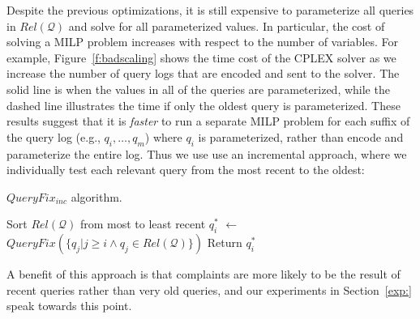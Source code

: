 
Despite the previous optimizations, it is still expensive to parameterize all 
queries in $Rel\mathcal{(Q)}$ and solve for all parameterized values.
In particular, the cost of solving a MILP problem increases 
with respect to the number of variables.
For example, Figure~\ref{f:badscaling} shows the time cost of the CPLEX solver
as we increase the number of query logs that are encoded and sent to the solver.  
The solid line is when the values in all of the queries are parameterized, while
the dashed line illustrates the time if only the oldest query is parameterized. 
These results suggest that it is {\it faster} to run a separate MILP problem for each 
suffix of the query log (e.g., $q_i, \ldots, q_m$) where $q_i$ is parameterized, 
rather than encode and parameterize the entire log.
Thus we use use an incremental approach, where we individually test each relevant query from the most recent
to the oldest:


\begin{algorithm}[htbp]
\caption{$QueryFix_{inc}$ algorithm.}
\label{alg:incalg}
\begin{algorithmic}
\STATE Sort $Rel\mathcal{(Q)}$ from most to least recent
  \STATE $q_i^*$ $\leftarrow$ $QueryFix(\{q_j | j \ge i \wedge q_j \in Rel\mathcal{(Q)}\})$
    \STATE Return $q_i^*$
  \ENDIF
\ENDFOR
\end{algorithmic}
\end{algorithm}



A benefit of this approach is that complaints are more likely to be the result of
recent queries rather than very old queries, and our experiments in Section~\ref{exp:}
speak towards this point.




